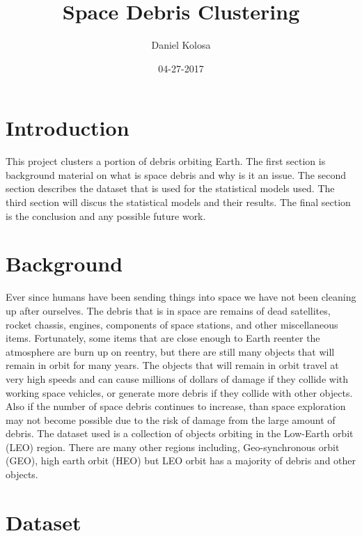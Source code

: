 \documentclass[12pt,a4paper]{article}
\title{Space Debris Clustering}
\author{Daniel Kolosa}
\date{04-27-2017}
\begin{document}
\maketitle

\section{Introduction}
This project clusters a portion of debris orbiting Earth. The first section is background material on what is space debris and why is it an issue. The second section describes the dataset that is used for the statistical models used. The third section will discus the statistical models and their results. The final section is the conclusion and any possible future work.   

\section{Background}
Ever since humans have been sending things into space we have not been cleaning up after ourselves. The debris that is in space are remains of dead satellites, rocket chassis, engines, components of space stations, and other miscellaneous items. Fortunately, some items that are close enough to Earth reenter the atmosphere are burn up on reentry, but there are still many objects that will remain in orbit for many years. The objects that will remain in orbit travel at very high speeds and can cause millions of dollars of damage if they collide with working space vehicles, or generate more debris if they collide with other objects. Also if the number of space debris continues to increase, than space exploration may not become possible due to the risk of damage from the large amount of debris. The dataset used is a collection of objects orbiting in the Low-Earth orbit (LEO) region. There are many other regions including, Geo-synchronous orbit (GEO), high earth orbit (HEO) but LEO orbit has a majority of debris and other objects. 

\section{Dataset}
\end{document}
